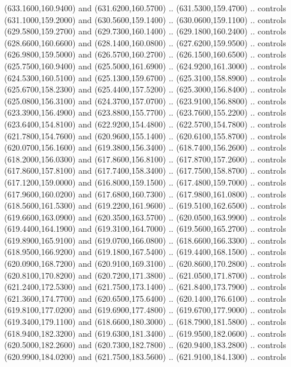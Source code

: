 {\begin{scope}[y=0.80pt, x=0.80pt, yscale=-1, xscale=1, inner sep=0pt, outer sep=0pt, #1]
      (633.1600,160.9400) and (631.6200,160.5700) .. (631.5300,159.4700) .. controls
      (631.1000,159.2000) and (630.5600,159.1400) .. (630.0600,159.1100) .. controls
      (629.5800,159.2700) and (629.7300,160.1400) .. (629.1800,160.2400) .. controls
      (628.6600,160.6600) and (628.1400,160.0800) .. (627.6200,159.9500) .. controls
      (626.9800,159.5000) and (626.5700,160.2700) .. (626.1500,160.6500) .. controls
      (625.7500,160.9400) and (625.5000,161.6900) .. (624.9200,161.3000) .. controls
      (624.5300,160.5100) and (625.1300,159.6700) .. (625.3100,158.8900) .. controls
      (625.6700,158.2300) and (625.4400,157.5200) .. (625.3000,156.8400) .. controls
      (625.0800,156.3100) and (624.3700,157.0700) .. (623.9100,156.8800) .. controls
      (623.3900,156.4900) and (623.8800,155.7700) .. (623.7600,155.2200) .. controls
      (623.6400,154.8100) and (622.9200,154.4800) .. (622.5700,154.7800) .. controls
      (621.7800,154.7600) and (620.9600,155.1400) .. (620.6100,155.8700) .. controls
      (620.0700,156.1600) and (619.3800,156.3400) .. (618.7400,156.2600) .. controls
      (618.2000,156.0300) and (617.8600,156.8100) .. (617.8700,157.2600) .. controls
      (617.8600,157.8100) and (617.7400,158.3400) .. (617.7500,158.8700) .. controls
      (617.1200,159.0000) and (616.8000,159.1500) .. (617.4800,159.7000) .. controls
      (617.9600,160.0200) and (617.6800,160.7300) .. (617.9800,161.0800) .. controls
      (618.5600,161.5300) and (619.2200,161.9600) .. (619.5100,162.6500) .. controls
      (619.6600,163.0900) and (620.3500,163.5700) .. (620.0500,163.9900) .. controls
      (619.4400,164.1900) and (619.3100,164.7000) .. (619.5600,165.2700) .. controls
      (619.8900,165.9100) and (619.0700,166.0800) .. (618.6600,166.3300) .. controls
      (618.9500,166.9200) and (619.1800,167.5400) .. (619.4400,168.1500) .. controls
      (620.0900,168.7200) and (620.9100,169.3100) .. (620.8600,170.2800) .. controls
      (620.8100,170.8200) and (620.7200,171.3800) .. (621.0500,171.8700) .. controls
      (621.2400,172.5300) and (621.7500,173.1400) .. (621.8400,173.7900) .. controls
      (621.3600,174.7700) and (620.6500,175.6400) .. (620.1400,176.6100) .. controls
      (619.8100,177.0200) and (619.6900,177.4800) .. (619.6700,177.9000) .. controls
      (619.3400,179.1100) and (618.6600,180.3000) .. (618.7900,181.5800) .. controls
      (618.9400,182.3200) and (619.6300,181.3400) .. (619.9500,182.0600) .. controls
      (620.5000,182.2600) and (620.7300,182.7800) .. (620.9400,183.2800) .. controls
      (620.9900,184.0200) and (621.7500,183.5600) .. (621.9100,184.1300) .. controls

\end{scope}}
